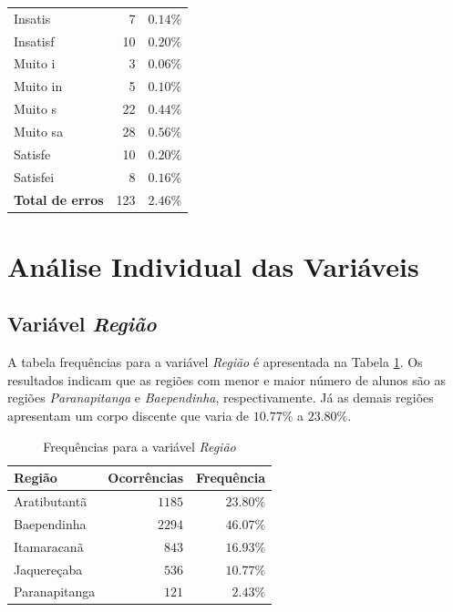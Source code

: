 \documentclass[10pt,a4paper,oneside]{article}
\newcommand{\arat}{Aratibutantã\xspace}
\newcommand{\baep}{Baependinha\xspace}
\newcommand{\itam}{Itamaracanã\xspace}
\newcommand{\jaqu}{Jaquereçaba\xspace}
\newcommand{\para}{Paranapitanga\xspace}
\begin{document}
\begin{table}[!h]
\begin{minipage}[t]{0.49\textwidth}
\begin{tabular}{l r r}
	Insatis    & 7   & $0.14\%$ \\
	Insatisf   & 10  & $0.20\%$ \\
	Muito i    & 3   & $0.06\%$ \\
	Muito in   & 5   & $0.10\%$ \\
	Muito s    & 22  & $0.44\%$ \\
	Muito sa   & 28  & $0.56\%$ \\
	Satisfe    & 10  & $0.20\%$ \\
	Satisfei   & 8   & $0.16\%$ \\	
	\midrule
	\textbf{Total de erros}  & 123  & $2.46\%$ \\	
	\bottomrule
\end{tabular}
\end{minipage}
\end{table}


\begin{table}[!h]
\centering

\end{table}

\FloatBarrier

\clearpage
\section*{Análise Individual das Variáveis}

\subsection*{Variável \textit{Região}}

A tabela frequências para a variável \textit{Região} é apresentada na Tabela \ref{table: frequencias regiao}. Os resultados indicam que as regiões com menor e maior número de alunos são as regiões \textit{\para} e \textit{\baep}, respectivamente. Já as demais regiões apresentam um corpo discente que varia de $10.77\%$ a $23.80\%$.

\begin{table}[h]
\small
\centering
\caption{Frequências para a variável \textit{Região}}
\label{table: frequencias regiao}
\vspace{0.5em}
\begin{tabular}{l r r}
	\toprule
	\textbf{Região} & \textbf{Ocorrências} & \textbf{Frequência} \\
	\midrule
	\arat           & $1185$               & $23.80\%$           \\
	\baep           & $2294$               & $46.07\%$           \\
	\itam           & $843$                & $16.93\%$           \\
	\jaqu           & $536$                & $10.77\%$           \\
	\para           & $121$                & $2.43\%$            \\
	\bottomrule
\end{tabular}
\end{table}
\end{document}
